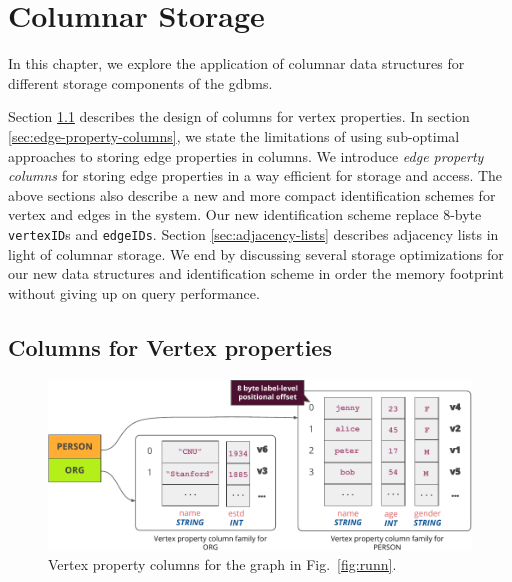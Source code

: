\chapter{Columnar Storage}
\label{c:columnar-storage}

In this chapter, we explore the application of columnar data structures for different storage components of the \gls{gdbms}. 

Section \ref{sec:vertex-property-columns} describes the design of columns for vertex properties. In section \ref{sec:edge-property-columns}, we state the limitations of using sub-optimal approaches to storing edge properties in columns. We introduce \emph{edge property columns} for storing edge properties in a way efficient for storage and access. The above sections also describe a new and more compact identification schemes for vertex and edges in the system. Our new identification scheme replace 8-byte \texttt{vertexID}s and \texttt{edgeIDs}. Section \ref{sec:adjacency-lists} describes adjacency lists in light of columnar storage. We end by discussing several storage optimizations for our new data structures and identification scheme in order the memory footprint without giving up on query performance.

\section{Columns for Vertex properties}
\label{sec:vertex-property-columns}

\begin{figure}
	\vspace{-15pt}
	\hfill\includegraphics[scale=0.85]{img/vpcols}\hspace*{\fill}
	\caption{Vertex property columns for the graph in Fig.~\ref{fig:runn}.}
	\label{fig:vpcols}
	\vspace{-8pt}
\end{figure}

